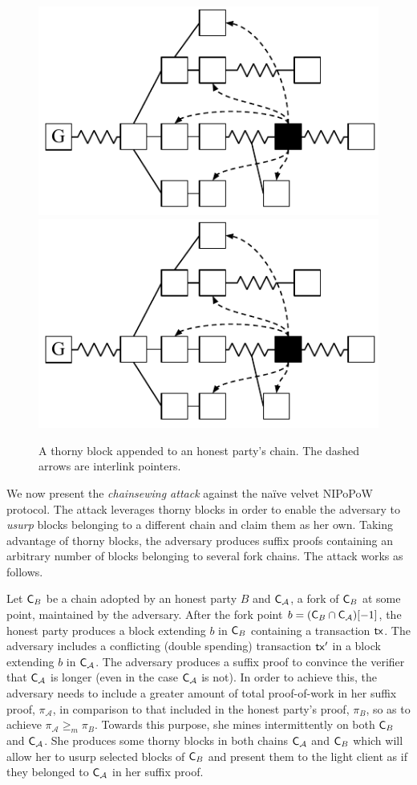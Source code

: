 \begin{figure}
	\begin{center}
		\iftwocolumn
			\includegraphics[width=0.65\columnwidth]{figures/thorny_block.pdf}
		\else
			\includegraphics[width=0.4\columnwidth]{figures/thorny_block.pdf}
		\fi
	\end{center}
	\caption{A thorny block appended to an honest party's chain.
	The dashed arrows are interlink pointers.}
	\label{fig:thorny_block}
\end{figure}

We now present the \emph{chainsewing attack} against the na\"ive velvet NIPoPoW
protocol. The attack leverages thorny blocks in order to enable the adversary to
\emph{usurp} blocks belonging to a different chain and claim them as her own.
Taking advantage of thorny blocks, the adversary produces suffix proofs
containing an arbitrary number of blocks belonging to several fork chains. The
attack works as follows.

Let $\mathsf{C}_B$ be a chain adopted by an honest party $B$ and $\mathsf{C}_\mathcal{A}$, a fork of $\mathsf{C}_B$ at some point, maintained by the adversary. After the fork point $b = (\mathsf{C}_B \cap \mathsf{C}_\mathcal{A})[-1]$, the honest party produces a block extending $b$ in $\mathsf{C}_B$ containing a transaction $\mathsf{tx}$. The adversary includes a conflicting (double spending) transaction $\mathsf{tx}'$ in a block extending $b$ in $\mathsf{C}_\mathcal{A}$.
The adversary produces a suffix proof to convince the verifier that $\mathsf{C}_\mathcal{A}$ is longer (even in the case $\mathsf{C}_\mathcal{A}$ is not). In order to achieve this, the adversary needs to include a greater amount of total proof-of-work in her suffix proof, $\pi_\mathcal{A}$, in comparison to that included in the honest party's proof, $\pi_B$, so as to achieve $\pi_\mathcal{A} \geq_m \pi_B$. Towards this purpose, she mines intermittently on both $\mathsf{C}_B$ and $\mathsf{C}_\mathcal{A}$. She produces some thorny blocks in both chains $\mathsf{C}_\mathcal{A}$ and $\mathsf{C}_B$ which will allow her to usurp selected blocks of $\mathsf{C}_B$ and present them to the light client as if they belonged to $\mathsf{C}_\mathcal{A}$ in her suffix proof.

